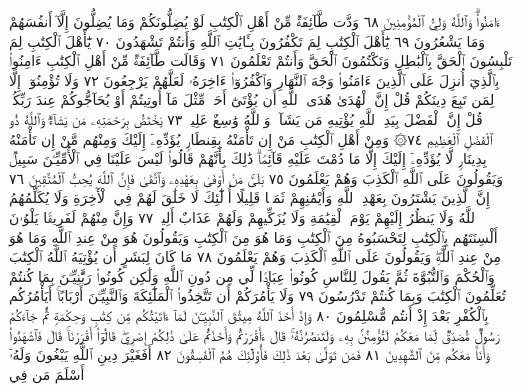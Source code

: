ءَامَنُوا۟ۗ وَٱللَّهُ وَلِيُّ ٱلْمُؤْمِنِينَ ٦٨ وَدَّت طَّآئِفَةࣱ مِّنْ أَهْلِ ٱلْكِتَٰبِ
لَوْ يُضِلُّونَكُمْ وَمَا يُضِلُّونَ إِلَّآ أَنفُسَهُمْ وَمَا يَشْعُرُونَ ٦٩ يَٰٓأَهْلَ
ٱلْكِتَٰبِ لِمَ تَكْفُرُونَ بِـَٔايَٰتِ ٱللَّهِ وَأَنتُمْ تَشْهَدُونَ ٧٠
يَٰٓأَهْلَ ٱلْكِتَٰبِ لِمَ تَلْبِسُونَ ٱلْحَقَّ بِٱلْبَٰطِلِ وَتَكْتُمُونَ ٱلْحَقَّ
وَأَنتُمْ تَعْلَمُونَ ٧١ وَقَالَت طَّآئِفَةࣱ مِّنْ أَهْلِ ٱلْكِتَٰبِ ءَامِنُوا۟
بِٱلَّذِيٓ أُنزِلَ عَلَى ٱلَّذِينَ ءَامَنُوا۟ وَجْهَ ٱلنَّهَارِ وَٱكْفُرُوٓا۟ ءَاخِرَهُۥ
لَعَلَّهُمْ يَرْجِعُونَ ٧٢ وَلَا تُؤْمِنُوٓا۟ إِلَّا لِمَن تَبِعَ دِينَكُمْ قُلْ إِنَّ
ٱلْهُدَىٰ هُدَى ٱللَّهِ أَن يُؤْتَىٰٓ أَحَدࣱ مِّثْلَ مَآ أُوتِيتُمْ أَوْ يُحَآجُّوكُمْ
عِندَ رَبِّكُمْۗ قُلْ إِنَّ ٱلْفَضْلَ بِيَدِ ٱللَّهِ يُؤْتِيهِ مَن يَشَآءُۗ وَٱللَّهُ
وَٰسِعٌ عَلِيمࣱ ٧٣ يَخْتَصُّ بِرَحْمَتِهِۦ مَن يَشَآءُۗ وَٱللَّهُ ذُو ٱلْفَضْلِ
ٱلْعَظِيمِ ٧٤۞ وَمِنْ أَهْلِ ٱلْكِتَٰبِ مَنْ إِن تَأْمَنْهُ بِقِنطَارࣲ
يُؤَدِّهِۦٓ إِلَيْكَ وَمِنْهُم مَّنْ إِن تَأْمَنْهُ بِدِينَارࣲ لَّا يُؤَدِّهِۦٓ إِلَيْكَ
إِلَّا مَا دُمْتَ عَلَيْهِ قَآئِمࣰاۗ ذَٰلِكَ بِأَنَّهُمْ قَالُوا۟ لَيْسَ عَلَيْنَا فِي
ٱلْأُمِّيِّـۧنَ سَبِيلࣱ وَيَقُولُونَ عَلَى ٱللَّهِ ٱلْكَذِبَ وَهُمْ يَعْلَمُونَ ٧٥
بَلَىٰۚ مَنْ أَوْفَىٰ بِعَهْدِهِۦ وَٱتَّقَىٰ فَإِنَّ ٱللَّهَ يُحِبُّ ٱلْمُتَّقِينَ ٧٦
إِنَّ ٱلَّذِينَ يَشْتَرُونَ بِعَهْدِ ٱللَّهِ وَأَيْمَٰنِهِمْ ثَمَنࣰا قَلِيلًا
أُو۟لَٰٓئِكَ لَا خَلَٰقَ لَهُمْ فِي ٱلْأٓخِرَةِ وَلَا يُكَلِّمُهُمُ ٱللَّهُ وَلَا يَنظُرُ
إِلَيْهِمْ يَوْمَ ٱلْقِيَٰمَةِ وَلَا يُزَكِّيهِمْ وَلَهُمْ عَذَابٌ أَلِيمࣱ ٧٧
وَإِنَّ مِنْهُمْ لَفَرِيقࣰا يَلْوُۥنَ أَلْسِنَتَهُم بِٱلْكِتَٰبِ لِتَحْسَبُوهُ
مِنَ ٱلْكِتَٰبِ وَمَا هُوَ مِنَ ٱلْكِتَٰبِ وَيَقُولُونَ هُوَ مِنْ
عِندِ ٱللَّهِ وَمَا هُوَ مِنْ عِندِ ٱللَّهِۖ وَيَقُولُونَ عَلَى ٱللَّهِ ٱلْكَذِبَ
وَهُمْ يَعْلَمُونَ ٧٨ مَا كَانَ لِبَشَرٍ أَن يُؤْتِيَهُ ٱللَّهُ ٱلْكِتَٰبَ
وَٱلْحُكْمَ وَٱلنُّبُوَّةَ ثُمَّ يَقُولَ لِلنَّاسِ كُونُوا۟ عِبَادࣰا لِّي مِن
دُونِ ٱللَّهِ وَلَٰكِن كُونُوا۟ رَبَّٰنِيِّـۧنَ بِمَا كُنتُمْ تُعَلِّمُونَ
ٱلْكِتَٰبَ وَبِمَا كُنتُمْ تَدْرُسُونَ ٧٩ وَلَا يَأْمُرَكُمْ أَن
تَتَّخِذُوا۟ ٱلْمَلَٰٓئِكَةَ وَٱلنَّبِيِّـۧنَ أَرْبَابًاۚ أَيَأْمُرُكُم بِٱلْكُفْرِ بَعْدَ
إِذْ أَنتُم مُّسْلِمُونَ ٨٠ وَإِذْ أَخَذَ ٱللَّهُ مِيثَٰقَ ٱلنَّبِيِّـۧنَ لَمَآ ءَاتَيْتُكُم
مِّن كِتَٰبࣲ وَحِكْمَةࣲ ثُمَّ جَآءَكُمْ رَسُولࣱ مُّصَدِّقࣱ لِّمَا
مَعَكُمْ لَتُؤْمِنُنَّ بِهِۦ وَلَتَنصُرُنَّهُۥۚ قَالَ ءَأَقْرَرْتُمْ وَأَخَذْتُمْ
عَلَىٰ ذَٰلِكُمْ إِصْرِيۖ قَالُوٓا۟ أَقْرَرْنَاۚ قَالَ فَٱشْهَدُوا۟ وَأَنَا۠ مَعَكُم
مِّنَ ٱلشَّٰهِدِينَ ٨١ فَمَن تَوَلَّىٰ بَعْدَ ذَٰلِكَ فَأُو۟لَٰٓئِكَ هُمُ
ٱلْفَٰسِقُونَ ٨٢ أَفَغَيْرَ دِينِ ٱللَّهِ يَبْغُونَ وَلَهُۥٓ أَسْلَمَ مَن فِي
